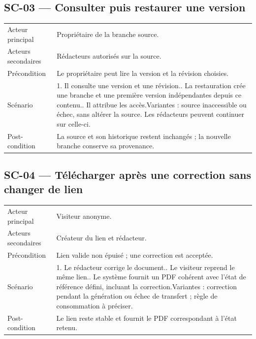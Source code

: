 \subsection{SC-03 --- Consulter puis restaurer une version}
\begin{longtable}{@{}L{30mm}L{126mm}@{}}
\toprule
Acteur principal & Propriétaire de la branche source.\\
Acteurs secondaires & Rédacteurs autorisés sur la source.\\
Précondition & Le propriétaire peut lire la version et la révision choisies.\\
Scénario & 1. Il consulte une version et une révision.. La restauration crée une branche et une première version indépendantes depuis ce contenu.. Il attribue les accès.\newline Variantes : source inaccessible ou échec, sans altérer la source. Les rédacteurs peuvent continuer sur celle-ci.\\
Post-condition & La source et son historique restent inchangés ; la nouvelle branche conserve sa provenance.\\
\bottomrule
\end{longtable}
\subsection{SC-04 --- Télécharger après une correction sans changer de lien}
\begin{longtable}{@{}L{30mm}L{126mm}@{}}
\toprule
Acteur principal & Visiteur anonyme.\\
Acteurs secondaires & Créateur du lien et rédacteur.\\
Précondition & Lien valide non épuisé ; une correction est acceptée.\\
Scénario & 1. Le rédacteur corrige le document.. Le visiteur reprend le même lien.. Le système fournit un PDF cohérent avec l’état de référence défini, incluant la correction.\newline Variantes : correction pendant la génération ou échec de transfert ; règle de consommation à préciser.\\
Post-condition & Le lien reste stable et fournit le PDF correspondant à l’état retenu.\\
\bottomrule
\end{longtable}

